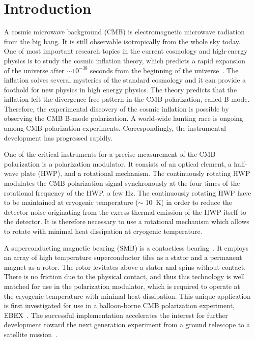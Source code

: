 \documentclass[a4paper,11pt]{jpconf}
\begin{document}
\section{Introduction}

A cosmic microwave background (CMB) is electromagnetic microwave radiation from the big bang.
It is still observable isotropically from the whole sky today.
One of most important research topics in the current cosmology and high-energy physics is to study the cosmic inflation theory, which predicts a rapid expansion of the universe after $\sim 10^{-38}$ seconds from the beginning of the universe~\cite{inflation_sato,inflation_guth}.
The inflation solves several mysteries of the standard cosmology and it can provide a foothold for new physics in high energy physics.
The theory predicts that the inflation left the divergence free pattern in the CMB polarization,  called B-mode.
Therefore, the experimental discovery of the cosmic inflation is possible by observing the CMB B-mode polarization.
A world-wide hunting race is ongoing among CMB polarization experiments.
Correspondingly, the instrumental development has progressed rapidly.

One of the critical instruments for a precise measurement of the CMB polarization is a polarization modulator.
It consists of an optical element, a half-wave plate (HWP), and a rotational mechanism.
The continuously rotating HWP modulates the CMB polarization signal synchronously at the four times of the rotational frequency of the HWP, a few Hz.
The continuously rotating HWP have to be maintained at cryogenic temperature ($\sim$ 10~K) in order to reduce the detector noise originating from the excess thermal emission of the HWP itself to the detector.
It is therefore necessary to use a rotational mechanism which allows to rotate with minimal heat dissipation at cryogenic temperature.

A superconducting magnetic bearing (SMB) is a contactless bearing~\cite{smb}.
It employs an array of high temperature superconductor tiles as a stator and a permanent magnet as a rotor.
The rotor levitates above a stator and spins without contact.
There is no friction due to the physical contact, and thus this technology is well matched for use in the polarization modulator, which is required to operate at the cryogenic temperature with minimal heat dissipation.
This unique application is first investigated for use in a balloon-borne CMB polarization experiment, EBEX~\cite{ebex}.
The successful implementation accelerates the interest for further development toward the next generation experiment from a ground telescope to a satellite mission~\cite{litebird}.
\end{document}
